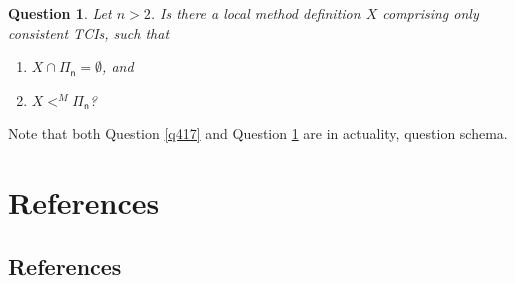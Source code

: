 \documentclass[12pt, twoside]{memoir}
\numberwithin{equation}{section}
\newtheorem{ques}[thm]{Question}
\theoremstyle{definition}
\theoremstyle{remark}
\theoremstyle{definition}
\theoremstyle{definition}
\theoremstyle{definition}
\theoremstyle{remark}
\begin{document}
\begin{ques}\label{q418}
Let $n > 2$. Is there a local method definition $X$ comprising only consistent TCIs, such that
\begin{enumerate}[label=(\arabic*)]
    \item $X \cap \mathsf{\Pi_n} = \emptyset$, and
    \item $X <^M \mathsf{\Pi_n}$?
\end{enumerate}
\end{ques}

Note that both Question \ref{q417} and Question \ref{q418} are in actuality, question schema.

\part{\texorpdfstring{ References}{References}}

\chapter{References}
\printbibliography[heading=none]
\end{document}
